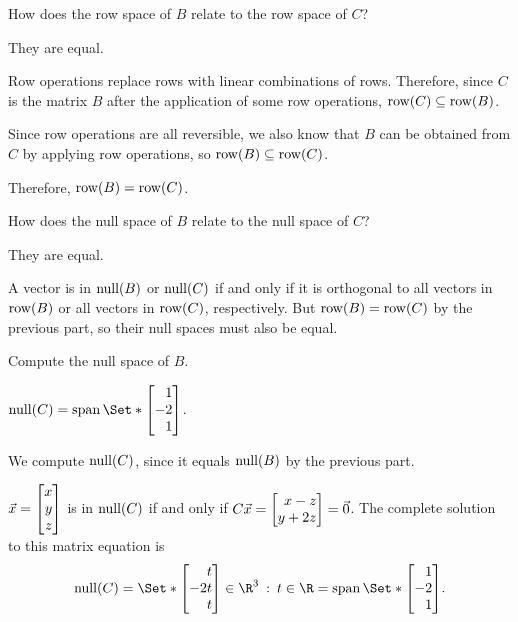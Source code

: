 \documentclass{problemset}
\begin{document}
	\begin{parts}
		\item How does the row space of $B$ relate to the row space of $C$?
			\begin{solution}
				They are equal.

				Row operations replace rows with linear combinations of rows.
				Therefore, since $C$ is the matrix $B$ after the application of
				some row operations, $\operatorname{row}(C)\subseteq\operatorname{row}(B)$.

				Since row operations are all reversible, we also know that $B$
				can be obtained from $C$ by applying row operations, so
				$\operatorname{row}(B)\subseteq\operatorname{row}(C)$.

				Therefore, $\operatorname{row}(B)=\operatorname{row}(C)$.
			\end{solution}
		\item How does the null space of $B$ relate to the null space of $C$?
			\begin{solution}
				They are equal.

				A vector is in $\operatorname{null}(B)$ or $\operatorname{null}(C)$ if and only if it is
				orthogonal to all vectors in $\operatorname{row}(B)$ or all vectors in $\operatorname{row}(C)$,
				respectively. But $\operatorname{row}(B)=\operatorname{row}(C)$ by the previous part, so
				their null spaces must also be equal.
			\end{solution}
		\item Compute the null space of $B$.
			\begin{solution}
				$\Null(C)=\Span\Set*{\mat{1\\-2\\1}}$.

				We compute $\operatorname{null}(C)$, since it equals $\operatorname{null}(B)$ by the previous part.

				$\vec x=\mat{x\\y\\z}$ is in $\operatorname{null}(C)$ if and only if
				$C\vec x = \mat{x-z\\y+2z} = \vec 0$. The complete solution to this matrix equation is
				\[
					\Null(C)=
					\Set*{\mat{t\\-2{t}\\t}\in\R^3 \given t\in\R}
					=\Span\Set*{\mat{1\\-2\\1}}.
				\]
			\end{solution}
	\end{parts}
\end{document}
